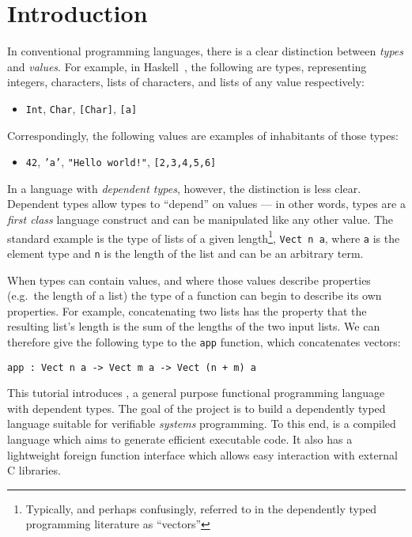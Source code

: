 \section{Introduction}

In conventional programming languages, there is a clear distinction between \emph{types} and \emph{values}.
For example, in Haskell~\cite{haskell-report}, the following are types, representing integers, characters, lists of characters, and lists of any value respectively:

\begin{itemize}
\item \texttt{Int}, \texttt{Char}, \texttt{[Char]}, \texttt{[a]}
\end{itemize}

\noindent
Correspondingly, the following values are examples of inhabitants of those types:

\begin{itemize}
\item \texttt{42}, \texttt{'a'}, \texttt{"Hello world!"}, \texttt{[2,3,4,5,6]}
\end{itemize}

\noindent
In a language with \emph{dependent types}, however, the distinction is less clear.  
Dependent types allow types to ``depend'' on values --- in other words, types are a \emph{first class} language construct and can be manipulated like any other value.
The standard example is the type of lists of a given length\footnote{Typically, and perhaps confusingly, referred to in the dependently typed programming literature as ``vectors''}, \texttt{Vect n a}, where \texttt{a} is the element type and \texttt{n} is the length of the list and can be an arbitrary term.

When types can contain values, and where those values describe properties (e.g.\ the length of a list) the type of a function can begin to describe its own properties.
For example, concatenating two lists has the property that the resulting list's length is the sum of the lengths of the two input lists.
We can therefore give the following type to the \texttt{app} function, which concatenates vectors: 

\begin{lstlisting}
app : Vect n a -> Vect m a -> Vect (n + m) a
\end{lstlisting}

\noindent
This tutorial introduces \Idris{}, a general purpose functional  programming language with dependent types.
The goal of the \Idris{} project is to build a dependently typed language suitable for verifiable \emph{systems} programming.
To this end, \Idris{} is a compiled language which aims to generate efficient executable code.
It also has a lightweight foreign function interface which allows easy interaction with external C libraries.

